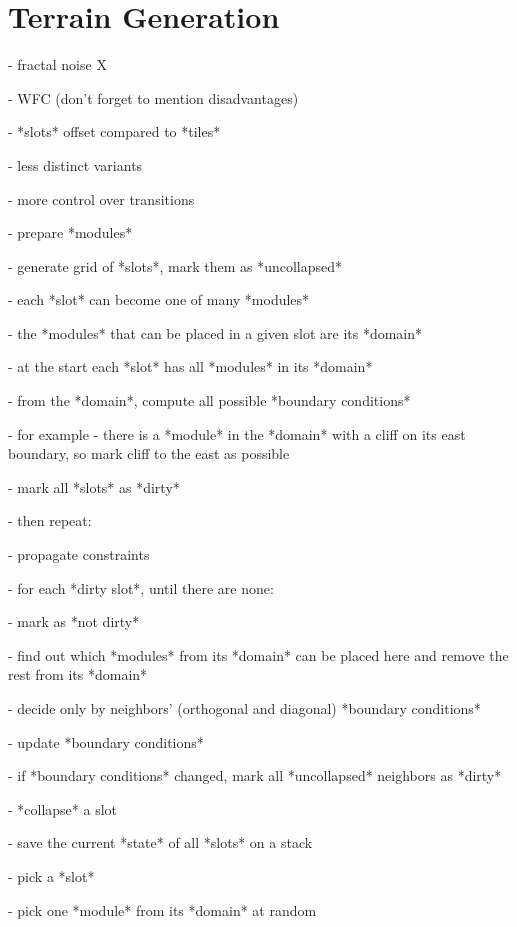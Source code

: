 \section{Terrain Generation}

- fractal noise X

- WFC \checkmark (don't forget to mention disadvantages)



- *slots* offset compared to *tiles*

- less distinct variants

- more control over transitions

- prepare *modules*

- generate grid of *slots*, mark them as *uncollapsed*

- each *slot* can become one of many *modules*

- the *modules* that can be placed in a given slot are its *domain*

- at the start each *slot* has all *modules* in its *domain*

- from the *domain*, compute all possible *boundary conditions*

- for example - there is a *module* in the *domain* with a cliff on its east boundary, so mark cliff to the east as possible

- mark all *slots* as *dirty*

- then repeat:

- propagate constraints

- for each *dirty slot*, until there are none:

- mark as *not dirty*

- find out which *modules* from its *domain* can be placed here and remove the rest from its *domain*

- decide only by neighbors' (orthogonal and diagonal) *boundary conditions*

- update *boundary conditions*

- if *boundary conditions* changed, mark all *uncollapsed* neighbors as *dirty*

- *collapse* a slot

- save the current *state* of all *slots* on a stack

- pick a *slot*

- pick one *module* from its *domain* at random

